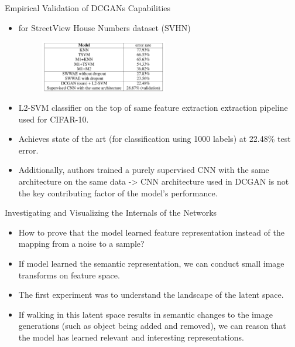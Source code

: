 \documentclass[10pt]{beamer}
\begin{document}
	\begin{frame}{Empirical Validation of DCGANs Capabilities}
		\begin{itemize}
			\item for StreetView House Numbers dataset (SVHN)
			\begin{figure}
				\includegraphics[width=15em]{figures/DCGAN-discriminator-feature-extractor-svhn.png}
			\end{figure}
			\item L2-SVM classifier on the top of same feature extraction extraction pipeline used for CIFAR-10.
			\item Achieves state of the art (for classification using 1000 labels) at 22.48\% test error.
			\item Additionally, authors trained a purely supervised CNN with the same architecture on the same data -> CNN architecture used in DCGAN is not the key contributing factor of the model's performance.
		\end{itemize}
	\end{frame}

	\begin{frame}{Investigating and Visualizing the Internals of the Networks}
		\begin{itemize}
			\item How to prove that the model learned feature representation instead of the mapping from a noise to a sample?
			\item If model learned the semantic representation, we can conduct small image transforms on feature space.
			\item The first experiment was to understand the landscape of the latent space.
			\item If walking in this latent space results in semantic changes to the image generations (such as object being added and removed), we can reason that the model has learned relevant and interesting representations.
		\end{itemize}
	\end{frame}
\end{document}

